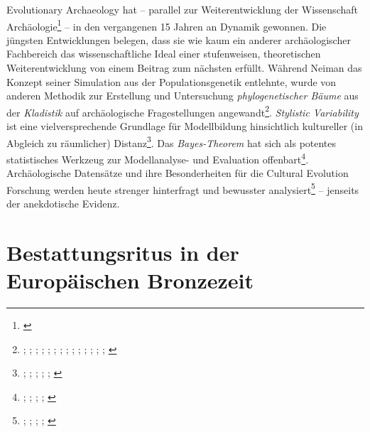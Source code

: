 \documentclass[openany,twoside,twocolumn]{book}
\let\rmarkdownfootnote\footnote%
\def\footnote{\protect\rmarkdownfootnote}
\let\pby\printbibliography
\renewcommand{\printbibliography}{}
\begin{document}
Evolutionary Archaeology hat -- parallel zur Weiterentwicklung der
Wissenschaft Archäologie\footnote{\textcite{kristiansen_towards_2014}}
-- in den vergangenen 15 Jahren an Dynamik gewonnen. Die jüngsten
Entwicklungen belegen, dass sie wie kaum ein anderer archäologischer
Fachbereich das wissenschaftliche Ideal einer stufenweisen,
theoretischen Weiterentwicklung von einem Beitrag zum nächsten erfüllt.
Während Neiman das Konzept seiner Simulation aus der Populationsgenetik
entlehnte, wurde von anderen Methodik zur Erstellung und Untersuchung
\emph{phylogenetischer Bäume} aus der \emph{Kladistik} auf
archäologische Fragestellungen angewandt\footnote{\textcite{bentley_cultural_2003};
  \textcite{boyd_are_1997}; \textcite{crema_culture_2014};
  \textcite{gray_pleasures_2007}; \textcite{lipo_mapping_2006};
  \textcite{lycett_multivariate_2017}; \textcite{mace_evolution_2005};
  \textcite{obrien_cladistics_2001}; \textcite{obrien_design_2016};
  \textcite{obrien_innovation_2014};
  \textcite{obrien_phylogenetics_2008}; \textcite{obrien_two_2002};
  \textcite{prentiss_cultural_2015};
  \textcite{tehrani_investigating_2002}; \textcite{watts_cultural_2016}}.
\emph{Stylistic Variability} ist eine vielversprechende Grundlage für
Modellbildung hinsichtlich kultureller (in Abgleich zu räumlicher)
Distanz\footnote{\textcite{bettinger_evolutionary_1997};
  \textcite{bettinger_point_1999}; \textcite{eerkens_cultural_2008-1};
  \textcite{eerkens_techniques_2001}; \textcite{porcic_exploring_2015};
  \textcite{porcic_simulating_2014}}. Das \emph{Bayes-Theorem} hat sich
als potentes statistisches Werkzeug zur Modellanalyse- und Evaluation
offenbart\footnote{\textcite{crema_approximate_2014};
  \textcite{crema_revealing_2016}; \textcite{dutta_bayesian_2018};
  \textcite{kandler_generative_2015}; \textcite{kandler_generative_2018}}.
Archäologische Datensätze und ihre Besonderheiten für die Cultural
Evolution Forschung werden heute strenger hinterfragt und bewusster
analysiert\footnote{\textcite{brantingham_detecting_2010};
  \textcite{cochrane_evolutionary_2009};
  \textcite{de_voogt_production_2015}; \textcite{perreault_impact_2011};
  \textcite{perreault_time-averaging_2018}} -- jenseits der anekdotische
Evidenz.

\newpage
\pby[title={Literatur},segment=\therefsegment,heading=subbibintoc]

\hypertarget{bronze-age-burial-rites}{%
\chapter{Bestattungsritus in der Europäischen
Bronzezeit}\label{bronze-age-burial-rites}}
\end{document}
